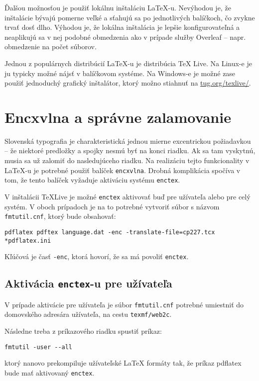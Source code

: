 Ďalšou možnosťou je použiť lokálnu inštaláciu LaTeX-u. Nevýhodou je, že inštalácie bývajú pomerne veľké a sťahujú sa po jednotlivých balíčkoch, čo zvykne trvať dosť dlho. Výhodou je, že lokálna inštalácia je lepšie konfigurovateľná a neaplikujú sa v nej podobné obmedzenia ako v prípade služby Overleaf -- napr. obmedzenie na počet súborov.

Jednou z populárnych distribúcií LaTeX-u je distribúcia TeX Live. Na Linux-e je ju typicky možné nájsť v balíčkovom systéme. Na Windows-e je možné zase použiť jednoduchý grafický inštalátor, ktorý možno stiahnuť na \href{https://www.tug.org/texlive/}{tug.org/texlive/}.

\section{Encxvlna a správne zalamovanie}

Slovenská typografia je charakteristická jednou mierne excentrickou požiadavkou -- že niektoré predložky a spojky nesmú byť na konci riadku. Ak sa tam vyskytnú, musia sa už zalomiť do nasledujúceho riadku. Na realizáciu tejto funkcionality v LaTeX-u je potrebné použiť balíček \texttt{encxvlna}. Drobná komplikácia spočíva v tom, že tento balíček vyžaduje aktiváciu systému \texttt{enctex}.

V inštalácii TeXLive je možné \texttt{enctex} aktivovať buď pre užívateľa alebo pre celý systém. V oboch prípadoch je na to potrebné vytvoriť súbor s názvom \texttt{fmtutil.cnf}, ktorý bude obsahovať:
\begin{Verbatim}
pdflatex pdftex language.dat -enc -translate-file=cp227.tcx *pdflatex.ini
\end{Verbatim}
Kľúčová je časť \texttt{-enc}, ktorá hovorí, že sa má povoliť \texttt{enctex}.

\subsection{Aktivácia \texttt{enctex}-u pre užívateľa}

V prípade aktivácie pre užívateľa je súbor \texttt{fmtutil.cnf} potrebné umiestniť do domovského adresára užívateľa, na cestu \texttt{texmf/web2c}.

Následne treba z príkazového riadku spustiť príkaz:
\begin{Verbatim}
fmtutil -user --all
\end{Verbatim}
ktorý nanovo prekompiluje užívateľské LaTeX formáty tak, že príkaz pdflatex bude mať aktivovaný \texttt{enctex}.

